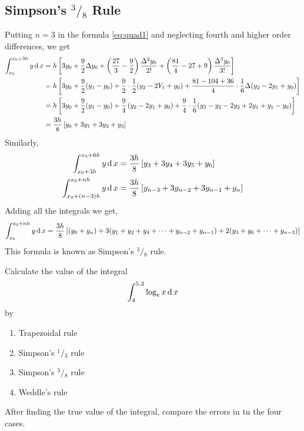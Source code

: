 \documentclass[12pt,class=book,crop=false]{standalone}
\begin{document}
\subsection{Simpson's $ {}^3/{}_8 $ Rule}
Putting $ n=3 $ in the formula \eqref{eq:quad1} and neglecting fourth and higher order differences, we get
\begin{align*}
    \int_{x_0}^{x_0+3h} y \,\mathrm{d}\, x & =h\left[ 3y_0+\frac{9}{2}\Delta y_0+\left( \frac{27}{3}-\frac{9}{2} \right)\frac{\Delta^2 y_0}{2!}+\left( \frac{81}{4}-27+9\right)\frac{\Delta^3 y_0}{3!} \right] \\
                              & =h\left[ 3y_0+\frac{9}{2}(y_1-y_0)+\frac{9}{2}\cdot\frac{1}{2}(y_2-2Y_1+y_0)+\frac{81-104+36}{4}\cdot\frac{1}{6}\Delta(y_2-2y_1+y_0)\right]                       \\
                              & =h\left[ 3y_0+\frac{9}{2}(y_1-y_0)+\frac{9}{4}\left( y_2-2y_1+y_0\right)+\frac{9}{4}\cdot\frac{1}{6}(y_3-y_2-2y_2+2y_1+y_1-y_0)\right]                            \\
                              & =\frac{3h}{8}\left[ y_0+3y_1+3y_2+y_3\right]
\end{align*}
Similarly,
\begin{align*}
    \int_{x_0+3h}^{x_0+6h} y \,\mathrm{d}\, x     & =\frac{3h}{8}\left[ y_3+3y_4+3y_5+y_6\right]             \\
    \int_{x_0+(n-3)h}^{x_0+nh} y \,\mathrm{d}\, x & =\frac{3h}{8}\left[ y_{n-3}+3y_{n-2}+3y_{n-1}+y_n\right]
\end{align*}
Adding all the integrals we get,
\[
    \int_{x_0}^{x_0+nh} y \,\mathrm{d}\, x =\frac{3h}{8}\left[ (y_0+y_n)+3(y_1+y_2+y_4+\dots+y_{n-2}+y_{n-1})+2(y_3+y_6+\dots+y_{n-3})\right]
\]
This formula is known as Simpson's $ {}^3/{}_{8} $ rule.
\begin{prob}
    Calculate the value of the integral
    \[
        \int_4^{5.2} \log_e x \,\mathrm{d}\, x
    \]
    by
    \begin{enumerate}[label=(\roman*)]
        \item Trapezoidal rule
        \item Simpson's $ {}^1/{}_3 $ rule
        \item Simpson's $ {}^3/{}_8 $ rule
        \item Weddle's rule
    \end{enumerate}
    After finding the true value of the integral, compare the errors in tn the four cases.
\end{prob}
\end{document}
